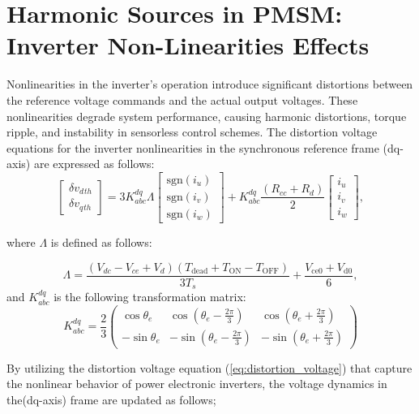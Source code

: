 \section{Harmonic Sources in PMSM: Inverter Non-Linearities Effects}
Nonlinearities in the inverter’s operation introduce significant distortions between the reference voltage commands and the actual output voltages. These nonlinearities degrade system performance, causing harmonic distortions, torque ripple, and instability in sensorless control schemes. The distortion voltage equations for the inverter nonlinearities in the synchronous reference frame (dq-axis) are expressed as follows:
\begin{equation}
\begin{bmatrix}
\delta v_d{}_{th} \\
\delta v_q{}_{th}
\end{bmatrix}
= 
3K_{abc}^{dq} \Lambda
\begin{bmatrix}
\text{sgn}(i_u) \\
\text{sgn}(i_v) \\
\text{sgn}(i_w)
\end{bmatrix}
+
K_{abc}^{dq} \frac{(R_{cc} + R_d)}{2}
\begin{bmatrix}
i_u \\
i_v \\
i_w
\end{bmatrix},
\label{eq:distortion_voltage}
\end{equation}

where $\Lambda$ is defined as follows:

\begin{equation}
\Lambda = \frac{(V_{dc} - V_{ce} + V_d)(T_{\text{dead}} + T_{\text{ON}} - T_{\text{OFF}})}{3T_s} + \frac{V_{\text{ce0}} + V_{\text{d0}}}{6},
\label{eq:Lambda}
\end{equation}
and $K_{abc}^{dq}$ is the following transformation matrix: 
\begin{equation}
K_{abc}^{dq} = 
\frac{2}{3}
\begin{pmatrix}
\cos\theta_e & \cos\left(\theta_e - \frac{2\pi}{3}\right) & \cos\left(\theta_e + \frac{2\pi}{3}\right) \\
-\sin\theta_e & -\sin\left(\theta_e - \frac{2\pi}{3}\right) & -\sin\left(\theta_e + \frac{2\pi}{3}\right)
\end{pmatrix}
\label{eq:transformation_matrix}
\end{equation}

\noindent By utilizing the distortion voltage equation (\ref{eq:distortion_voltage}) that capture the nonlinear behavior of power electronic inverters, the voltage dynamics in the(dq-axis) frame are updated as follows;

